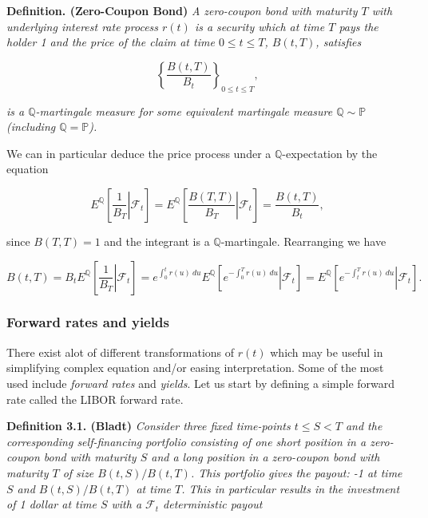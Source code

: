 \documentclass[a4paper,10pt,openany]{book}
\begin{document}
\textbf{Definition. (Zero-Coupon Bond)} \emph{A zero-coupon bond with maturity \(T\) with underlying interest rate process \(r(t)\) is a security which at time \(T\) pays the holder 1 and the price of the claim at time \(0\le t\le T\), \(B(t,T)\), satisfies}

\[
\left\{\frac{B(t,T)}{B_t}\right\}_{0\le t\le T},
\]

\emph{is a \(\mathbb Q\)-martingale measure for some equivalent martingale measure \(\mathbb Q\sim \mathbb P\) (including \(\mathbb Q = \mathbb P\)).}

We can in particular deduce the price process under a \(\mathbb Q\)-expectation by the equation

\[
E^{\mathbb Q}\left[\left.\frac{1}{B_T}\right\vert \mathcal F_t\right]=E^{\mathbb Q}\left[\left.\frac{B(T,T)}{B_T}\right\vert \mathcal F_t\right]=\frac{B(t,T)}{B_t},
\]

since \(B(T,T)=1\) and the integrant is a \(\mathbb Q\)-martingale. Rearranging we have

\[
B(t,T)=B_tE^{\mathbb Q}\left[\left.\frac{1}{B_T}\right\vert \mathcal F_t\right]=e^{\int_0^t r(u)\ du}E^{\mathbb Q}\left[\left.e^{-\int_0^T r(u)\ du}\right\vert \mathcal F_t\right]=E^{\mathbb Q}\left[\left.e^{-\int_t^T r(u)\ du}\right\vert \mathcal F_t\right].\tag{11}
\]

\hypertarget{forward-rates-and-yields}{%
\subsubsection{Forward rates and yields}\label{forward-rates-and-yields}}

There exist alot of different transformations of \(r(t)\) which may be useful in simplifying complex equation and/or easing interpretation. Some of the most used include \emph{forward rates} and \emph{yields}. Let us start by defining a simple forward rate called the LIBOR forward rate.

\textbf{Definition 3.1. (Bladt)} \emph{Consider three fixed time-points \(t\le S< T\) and the corresponding self-financing portfolio consisting of one short position in a zero-coupon bond with maturity \(S\) and a long position in a zero-coupon bond with maturity \(T\) of size \(B(t,S)/B(t,T)\). This portfolio gives the payout: -1 at time \(S\) and \(B(t,S)/B(t,T)\) at time \(T\). This in particular results in the investment of 1 dollar at time \(S\) with a \(\mathcal F_t\) deterministic payout}
\end{document}
